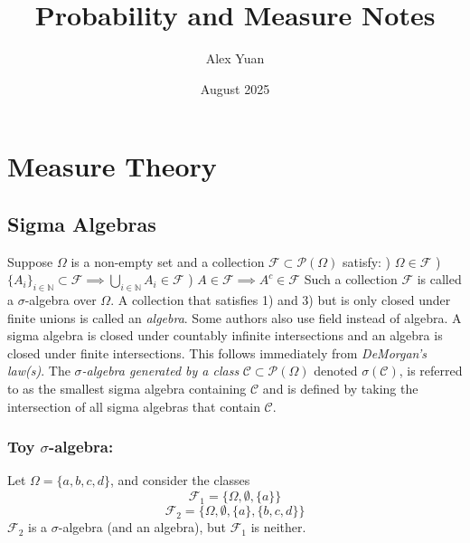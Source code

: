 \documentclass{article}
\title{Probability and Measure Notes}
\author{Alex Yuan}
\date{August 2025}
\begin{document}
\maketitle
\section{Measure Theory}

\subsection{Sigma Algebras}
Suppose $\Omega$ is a non-empty set and a collection $\mathcal{F} \subset \mathcal{P}(\Omega)$ satisfy: \newline {}) $\Omega \in \mathcal{F}$ \newline {}) $\{A_i\}_{i \in \mathbb{N}} \subset \mathcal{F} \implies \bigcup_{i \in\mathbb{N}}A_i \in \mathcal{F}$ \newline {}) $A \in \mathcal{F} \implies A^c\in \mathcal{F} $ \newline \newline
Such a collection  $\mathcal{F}$ is called a $\sigma$-algebra over $\Omega$. A collection that satisfies 1) and 3) but is only closed under finite unions is called an \emph{algebra}. Some authors also use field instead of algebra. \newline \newline
A sigma algebra is closed under countably infinite intersections and an algebra is closed under finite intersections. This follows immediately from \emph{DeMorgan's law(s)}.\newline \newline
The \emph{$\sigma$-algebra generated by a class} $\mathcal{C}\subset \mathcal{P}(\Omega)$ denoted $\sigma(\mathcal{C})$, is referred to as the smallest sigma algebra containing $\mathcal{C}$ and is defined by taking the intersection of all sigma algebras that contain $\mathcal{C}$.
\subsubsection{Toy $\sigma$-algebra:}

Let $\Omega = \{a,b,c,d\}$, and consider the classes \[
\mathcal{F}_1 = \{\Omega, \emptyset, \{a\}\}
\]
\[
\mathcal{F}_2 = \{\Omega, \emptyset, \{a\}, \{b,c,d\}\}
\]
$\mathcal{F}_2$ is a $\sigma$-algebra (and an algebra), but $\mathcal{F}_1$ is neither. 
\end{document}
